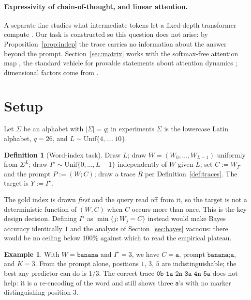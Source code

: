 \documentclass{article}
\theoremstyle{plain}
\theoremstyle{definition}
\newtheorem{definition}{Definition}
\newtheorem{example}{Example}
\theoremstyle{remark}
\newcommand{\1}{\mathbf{1}}
\begin{document}
\paragraph{Expressivity of chain-of-thought, and linear attention.}
A separate line studies what intermediate tokens let a fixed-depth transformer
compute \citep{feng2023towards,merrill2024expressive,li2024chain}. Our task is
constructed so this question does not arise: by Proposition~\ref{prop:indep} the
trace carries no information about the answer beyond the prompt.
Section~\ref{sec:matrix} works with the softmax-free attention map
\citep{katharopoulos2020transformers}, the standard vehicle for provable
statements about attention dynamics
\citep{vonoswald2023transformers,zhang2024incontext}; dimensional factors come
from \citet{tropp2011freedman}.

\section{Setup}
\label{sec:setup}

Let $\Sigma$ be an alphabet with $|\Sigma| = q$; in experiments $\Sigma$ is the
lowercase Latin alphabet, $q = 26$, and $L\sim\mathrm{Unif}\{4,\dots,10\}$.

\begin{definition}[Word-index task]
\label{def:task}
Draw $L$; draw $W = (W_0,\dots,W_{L-1})$ uniformly from $\Sigma^L$; draw
$I^\star\sim\mathrm{Unif}\{0,\dots,L-1\}$ independently of $W$ given $L$; set
$C := W_{I^\star}$ and the prompt $P := (W;C)$; draw a trace $R$ per
Definition~\ref{def:traces}. The target is $Y := I^\star$.
\end{definition}

The gold index is drawn \emph{first} and the query read off from it, so the
target is not a deterministic function of $(W,C)$ when $C$ occurs more than once.
This is the key design decision. Defining $I^\star$ as $\min\{j : W_j = C\}$
instead would make Bayes accuracy identically $1$ and the analysis of
Section~\ref{sec:bayes} vacuous: there would be no ceiling below $100\%$ against
which to read the empirical plateau.

\begin{example}
\label{ex:instance}
With $W = \texttt{banana}$ and $I^\star = 3$, we have $C = \texttt{a}$, prompt
$\texttt{banana;a}$, and $K = 3$. From the prompt alone, positions $1$, $3$, $5$
are indistinguishable; the best any predictor can do is $1/3$. The correct trace
$\texttt{0b 1a 2n 3a 4n 5a}$ does not help: it is a re-encoding of the word and
still shows three \texttt{a}'s with no marker distinguishing position $3$.
\end{example}
\end{document}
